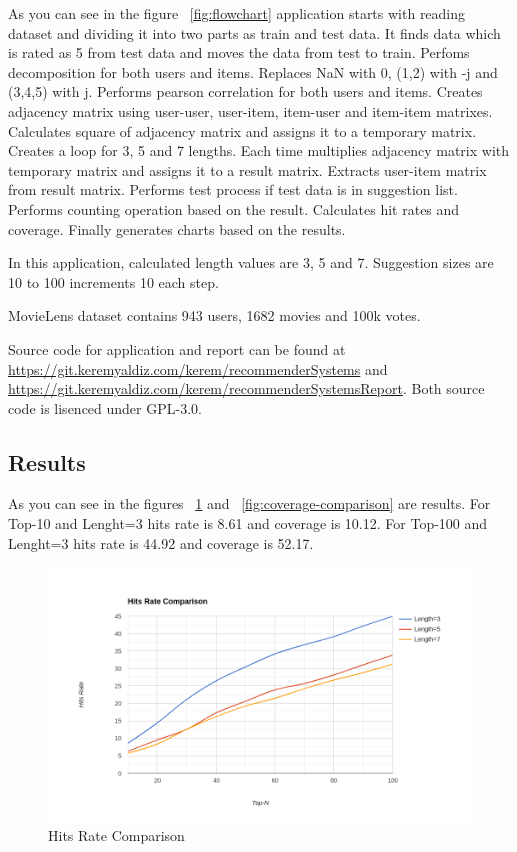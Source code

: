 As you can see in the figure ~\ref{fig:flowchart} application starts with reading dataset and dividing it into two parts as train and test data. It finds data which is rated as 5 from test data and moves the data from test to train. Perfoms decomposition for both users and items. Replaces NaN with 0, (1,2) with -j and (3,4,5) with j. Performs pearson correlation for both users and items. Creates adjacency matrix using user-user, user-item, item-user and item-item matrixes. Calculates square of adjacency matrix and assigns it to a temporary matrix. Creates a loop for 3, 5 and 7 lengths. Each time multiplies adjacency matrix with temporary matrix and assigns it to a result matrix. Extracts user-item matrix from result matrix. Performs test process if test data is in suggestion list. Performs counting operation based on the result. Calculates hit rates and coverage. Finally generates charts based on the results.

In this application, calculated length values are 3, 5 and 7. Suggestion sizes are 10 to 100 increments 10 each step.

MovieLens dataset contains 943 users, 1682 movies and 100k votes.

Source code for application and report can be found at \url{https://git.keremyaldiz.com/kerem/recommenderSystems} and \url{https://git.keremyaldiz.com/kerem/recommenderSystemsReport}. Both source code is lisenced under GPL-3.0.

\subsection{Results}
As you can see in the figures ~\ref{fig:hits-rate-comparison} and ~\ref{fig:coverage-comparison} are results. For Top-10 and Lenght=3 hits rate is 8.61 and coverage is 10.12. For Top-100 and Lenght=3 hits rate is 44.92 and coverage is 52.17.

\begin{figure}[h!]
   \centering
   \includegraphics[width=1\linewidth]{images/hits-rate-comparison.png}
   \caption{Hits Rate Comparison}
   \label{fig:hits-rate-comparison}
\end{figure}

